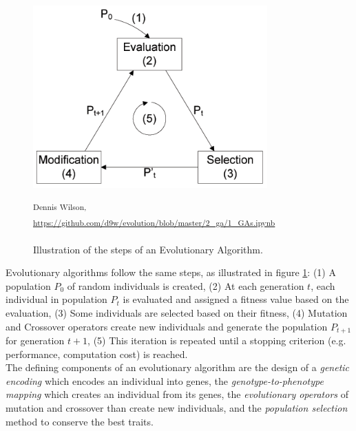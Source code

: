 \begin{figure}[H]
 \centering
 \captionsetup{justification=centering, margin=0.5cm}
 \includegraphics[width=9cm]{images/GA.png}
 \caption{Illustration of the steps of an Evolutionary Algorithm.}
\small\textsuperscript{Dennis Wilson, \url{https://github.com/d9w/evolution/blob/master/2_ga/1_GAs.ipynb}}
 \label{fig:GA}
\end{figure}

Evolutionary algorithms follow the same steps, as illustrated in figure \ref{fig:GA}: (1) A population $P_0$ of random individuals is created, (2) At each generation $t$, each individual in population $P_t$ is evaluated and assigned a fitness value based on the evaluation, (3) Some individuals are selected based on their fitness, (4) Mutation and Crossover operators create new individuals and generate the population $P_{t+1}$ for generation $t+1$, (5) This iteration is repeated until a stopping criterion (e.g. performance, computation cost) is reached.
\\


The defining components of an evolutionary algorithm are the design of a \textit{genetic encoding} which encodes an individual into genes, the \textit{genotype-to-phenotype mapping} which creates an individual from its genes, the  \textit{evolutionary operators} of mutation and crossover than create new individuals, and the \textit{population selection} method to conserve the best traits.


